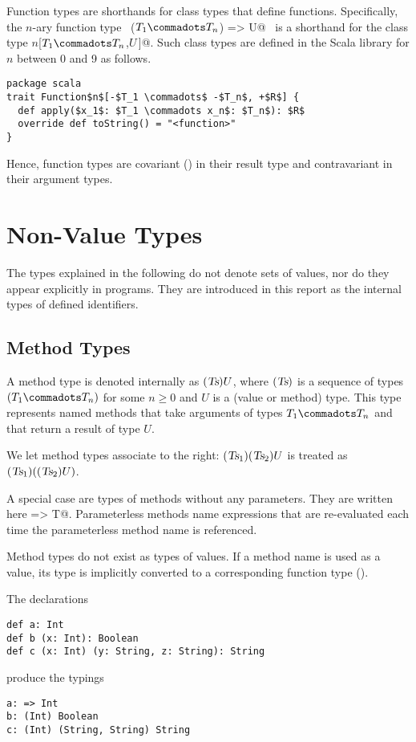 Function types are shorthands for class types that define 
functions.  Specifically, the $n$-ary function type 
~\lstinline@($T_1 \commadots T_n$) => U@~ is a shorthand for the class type
\lstinline@Function$n$[$T_1 \commadots T_n$,$U\,$]@. Such class
types are defined in the Scala library for $n$ between 0 and 9 as follows.
\begin{lstlisting}
package scala 
trait Function$n$[-$T_1 \commadots$ -$T_n$, +$R$] {
  def apply($x_1$: $T_1 \commadots x_n$: $T_n$): $R$ 
  override def toString() = "<function>" 
}
\end{lstlisting}
Hence, function types are covariant () in their
result type and contravariant in their argument types.

\section{Non-Value Types}
\label{sec:synthetic-types}

The types explained in the following do not denote sets of values, nor
do they appear explicitly in programs. They are introduced in this
report as the internal types of defined identifiers.

\subsection{Method Types}
\label{sec:method-types}

A method type is denoted internally as $(\mbox{\sl Ts})U$, where $(\mbox{\sl Ts})$ is a
sequence of types $(T_1 \commadots T_n)$ for some $n \geq 0$
and $U$ is a (value or method) type.  This type represents named
methods that take arguments of types $T_1 \commadots T_n$ 
and that return a result of type $U$.

We let method types associate to the right: $(\mbox{\sl Ts}_1)(\mbox{\sl Ts}_2)U$ is
treated as $(\mbox{\sl Ts}_1)((\mbox{\sl Ts}_2)U)$.

A special case are types of methods without any parameters. They are
written here \lstinline@=> T@. Parameterless methods name expressions
that are re-evaluated each time the parameterless method name is
referenced.

Method types do not exist as types of values. If a method name is used
as a value, its type is implicitly converted to a corresponding
function type ().

\example The declarations
\begin{lstlisting}
def a: Int
def b (x: Int): Boolean
def c (x: Int) (y: String, z: String): String
\end{lstlisting}
produce the typings
\begin{lstlisting}
a: => Int
b: (Int) Boolean
c: (Int) (String, String) String
\end{lstlisting}

